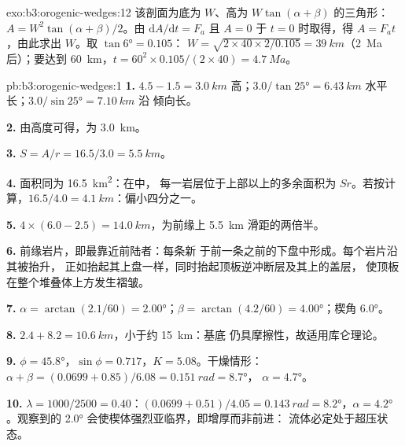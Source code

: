\begin{solution}{exo:b3:orogenic-wedges:12}
该剖面为底为 $W$、高为 $W\tan(\alpha + \beta)$ 的三角形：
$A = W^2\tan(\alpha + \beta)/2$。由 $\mathrm dA/\mathrm dt = F_a$ 且 $A =
0$ 于 $t = 0$ 时取得，得 $A = F_at$，由此求出 $W$。取 $\tan\ang{6} = 0.105$：
$W = \sqrt{2\times40\times2/0.105} = \qty{39}{km}$（\qty{2}{Ma} 后）；要达到 \qty{60}{km}，$t =
60^2\times0.105/(2\times40) = \qty{4.7}{Ma}$。
\end{solution}

\begin{solution}{pb:b3:orogenic-wedges:1}
\textbf{1.} $4.5 - 1.5 = \qty{3.0}{km}$ 高；$3.0/\tan\ang{25} =
\qty{6.43}{km}$ 水平长；$3.0/\sin\ang{25} = \qty{7.10}{km}$ 沿
倾向长。

\textbf{2.} 由高度可得，为 \qty{3.0}{km}。

\textbf{3.} $S = A/r = 16.5/3.0 = \qty{5.5}{km}$。

\textbf{4.} 面积同为 \qty{16.5}{km^2}：在中，
每一岩层位于上部以上的多余面积为 $Sr$。若按计算，$16.5/4.0 =
\qty{4.1}{km}$：偏小四分之一。

\textbf{5.} $4\times(6.0 - 2.5) = \qty{14.0}{km}$，为前缘上
\qty{5.5}{km} 滑距的两倍半。

\textbf{6.} 前缘岩片，即最靠近前陆者：每条新
于前一条之前的下盘中形成。每个岩片沿其被抬升，
正如抬起其上盘一样，同时抬起顶板逆冲断层及其上的盖层，
使顶板在整个堆叠体上方发生褶皱。

\textbf{7.} $\alpha = \arctan(2.1/60) = \ang{2.00}$；$\beta =
\arctan(4.2/60) = \ang{4.00}$；楔角 \ang{6.0}。

\textbf{8.} $2.4 + 8.2 = \qty{10.6}{km}$，小于约 \qty{15}{km}：基底
仍具摩擦性，故适用库仑理论。

\textbf{9.} $\phi = \ang{45.8}$，$\sin\phi = 0.717$，$K = 5.08$。干燥情形：
$\alpha + \beta = (0.0699 + 0.85)/6.08 = \qty{0.151}{rad} = \ang{8.7}$，
$\alpha = \ang{4.7}$。

\textbf{10.} $\lambda = 1000/2500 = 0.40$：$(0.0699 + 0.51)/4.05 =
\qty{0.143}{rad} = \ang{8.2}$，$\alpha = \ang{4.2}$。观察到的 \ang{2.0}
会使楔体强烈亚临界，即增厚而非前进：
流体必定处于超压状态。


\end{solution}
